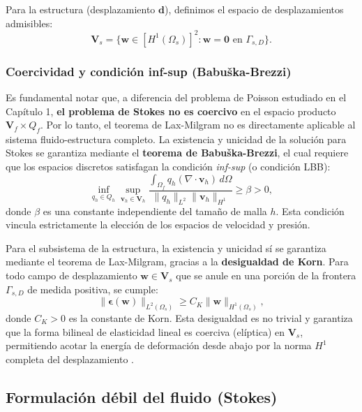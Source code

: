 \documentclass[12pt, letterpaper]{report}
\theoremstyle{definition}
\begin{document}
Para la estructura (desplazamiento $\mathbf{d}$), definimos el espacio de desplazamientos admisibles:
\[
\mathbf{V}_s = \{ \mathbf{w} \in [H^1(\Omega_s)]^2 : \mathbf{w} = \mathbf{0} \text{ en } \Gamma_{s,D} \}.
\]

\subsubsection*{Coercividad y condición inf-sup (Babuška-Brezzi)}

Es fundamental notar que, a diferencia del problema de Poisson estudiado en el Capítulo 1, \textbf{el problema de Stokes no es coercivo} en el espacio producto $\mathbf{V}_f \times Q_f$. Por lo tanto, el teorema de Lax-Milgram no es directamente aplicable al sistema fluido-estructura completo. La existencia y unicidad de la solución para Stokes se garantiza mediante el \textbf{teorema de Babuška-Brezzi}, el cual requiere que los espacios discretos satisfagan la condición \textit{inf-sup} (o condición LBB):
\begin{equation}
    \inf_{q_h \in Q_h} \sup_{\mathbf{v}_h \in \mathbf{V}_h} \frac{\int_{\Omega_f} q_h (\nabla \cdot \mathbf{v}_h) \, d\Omega}{\|q_h\|_{L^2} \|\mathbf{v}_h\|_{H^1}} \geq \beta > 0,
\end{equation}
donde $\beta$ es una constante independiente del tamaño de malla $h$. Esta condición vincula estrictamente la elección de los espacios de velocidad y presión.

Para el subsistema de la estructura, la existencia y unicidad sí se garantiza mediante el teorema de Lax-Milgram, gracias a la \textbf{desigualdad de Korn}. Para todo campo de desplazamiento $\mathbf{w} \in \mathbf{V}_s$ que se anule en una porción de la frontera $\Gamma_{s,D}$ de medida positiva, se cumple:
\begin{equation}
    \|\boldsymbol{\epsilon}(\mathbf{w})\|_{L^2(\Omega_s)} \geq C_K \|\mathbf{w}\|_{H^1(\Omega_s)},
\end{equation}
donde $C_K > 0$ es la constante de Korn. Esta desigualdad es no trivial y garantiza que la forma bilineal de elasticidad lineal es coerciva (elíptica) en $\mathbf{V}_s$, permitiendo acotar la energía de deformación desde abajo por la norma $H^1$ completa del desplazamiento \cite{ciarlet1988mathematical}.

\subsection{Formulación débil del fluido (Stokes)}
\end{document}
